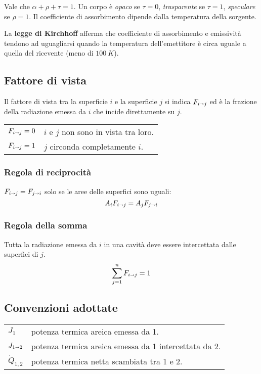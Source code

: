Vale che $\alpha + \rho + \tau = 1$. Un corpo è \emph{opaco} se $\tau = 0$, \emph{trasparente} se $\tau = 1$, \emph{speculare} se $\rho = 1$.
Il coefficiente di assorbimento dipende dalla temperatura della sorgente.

La \textbf{legge di Kirchhoff} afferma che coefficiente di assorbimento e emissività tendono ad uguagliarsi quando la temperatura dell'emettitore è circa uguale a quella del ricevente (meno di $\SI{100}{K}$).

\subsection{Fattore di vista}

Il fattore di vista tra la superficie $i$ e la superficie $j$ si indica $F_{i\shortrightarrow j}$ ed è la frazione della radiazione emessa da $i$ che incide direttamente su $j$.

\begin{tabular}{ll}
    $F_{i\shortrightarrow j} = 0$ & $i$ e $j$ non sono in vista tra loro. \\
    $F_{i\shortrightarrow j} = 1$ & $j$ circonda completamente $i$.
\end{tabular}

\subsubsection{Regola di reciprocità}
$F_{i\shortrightarrow j} = F_{j\shortrightarrow i}$ solo se le aree delle superfici sono uguali:
\[
    A_iF_{i\shortrightarrow j} = A_jF_{j\shortrightarrow i}
\]

\subsubsection{Regola della somma}
Tutta la radiazione emessa da $i$ in una cavità deve essere intercettata dalle superfici di $j$.
\[
    \sum_{j=1}^n F_{i\shortrightarrow j} = 1
\]


\subsection{Convenzioni adottate}

\begin{tabular}{ll}
    $J_1$ & potenza termica areica emessa da 1. \\
    $J_{1\shortrightarrow 2}$ & potenza termica areica emessa da 1 intercettata da 2. \\
    $\dot{Q}_{1,2}$ & potenza termica netta scambiata tra 1 e 2. \\
\end{tabular}

